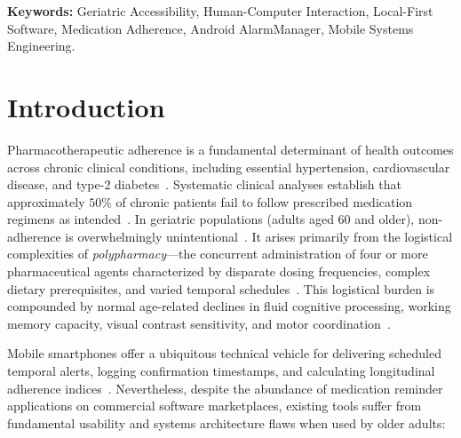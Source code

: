\documentclass[11pt,a4paper]{article}
\begin{document}
\begin{abstract}
al.~\cite{bangor2008empirical,lewis2009factor}) compared to $57.19 \pm 12.45$ for standard radial dials. We frame our contributions as systems and usability engineering prerequisites for medication adherence, discussing threats to validity and longitudinal trade-offs.
\end{abstract}

\textbf{Keywords:} Geriatric Accessibility, Human-Computer Interaction, Local-First Software, Medication Adherence, Android AlarmManager, Mobile Systems Engineering.

\section{Introduction}
\label{sec:introduction}

Pharmacotherapeutic adherence is a fundamental determinant of health outcomes across chronic clinical conditions, including essential hypertension, cardiovascular disease, and type-2 diabetes~\cite{who2003adherence,haynes2002helping,osterberg2005adherence,ada2023standards}. Systematic clinical analyses establish that approximately $50\%$ of chronic patients fail to follow prescribed medication regimens as intended~\cite{who2003adherence,morisky1986concurrent}. In geriatric populations (adults aged 60 and older), non-adherence is overwhelmingly unintentional~\cite{fisk2009designing,stronge2007human}. It arises primarily from the logistical complexities of \emph{polypharmacy}---the concurrent administration of four or more pharmaceutical agents characterized by disparate dosing frequencies, complex dietary prerequisites, and varied temporal schedules~\cite{dayer2013smartphone,nau2012proportion}. This logistical burden is compounded by normal age-related declines in fluid cognitive processing, working memory capacity, visual contrast sensitivity, and motor coordination~\cite{kurniawan2008older,trewin2013physical,siek2006fat,wildenbos2018aging}.

Mobile smartphones offer a ubiquitous technical vehicle for delivering scheduled temporal alerts, logging confirmation timestamps, and calculating longitudinal adherence indices~\cite{dayer2013smartphone}. Nevertheless, despite the abundance of medication reminder applications on commercial software marketplaces, existing tools suffer from fundamental usability and systems architecture flaws when used by older adults:
\end{document}
